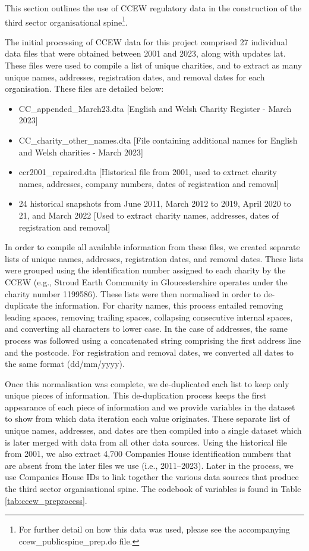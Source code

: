 \documentclass{article}
\begin{document}
This section outlines the use of CCEW regulatory data in the construction of the third sector
organisational spine\footnote{For further detail on how this data was used, please see the accompanying
ccew\_publicspine\_prep.do file.}.

The initial processing of CCEW data for this project comprised 27 individual data files that were obtained
between 2001 and 2023, along with updates lat. These files were used to compile a list of unique charities, and to
extract   as   many   unique   names,   addresses,   registration   dates,   and   removal   dates   for   each
organisation. These files are detailed below: 
\begin{itemize}
  \item CC\_appended\_March23.dta [English and Welsh Charity Register - March 2023]

  \item CC\_charity\_other\_names.dta [File containing additional names for English and Welsh
charities - March 2023]
  \item ccr2001\_repaired.dta   [Historical   file   from   2001,   used   to   extract   charity   names,
addresses, company numbers, dates of registration and removal]
  \item 24 historical snapshots from June 2011, March 2012 to 2019, April 2020 to 21, and March
2022 [Used to extract charity names, addresses, dates of registration and removal]
\end{itemize}

In order to compile all available information from these files, we created separate lists of unique
names, addresses, registration dates, and removal dates. These lists were grouped using the
identification number assigned to each charity by the CCEW (e.g., Stroud Earth Community in
Gloucestershire operates under the charity number 1199586). These lists were then normalised
in order to de-duplicate the information. For charity names, this process entailed removing
leading   spaces,   removing   trailing   spaces,   collapsing   consecutive   internal   spaces,   and
converting all characters to lower case. In the case of addresses, the same process was followed
using a concatenated string comprising the first address line and the postcode. For registration
and removal dates, we converted all dates to the same format (dd/mm/yyyy).

Once this normalisation was complete, we de-duplicated each list to keep only unique pieces of
information.   This   de-duplication   process   keeps   the   first   appearance   of   each   piece   of
information and we provide variables in the dataset to show from which data iteration each
value originates. These separate list of unique names, addresses, and dates are then compiled
into a single dataset which is later merged with data from all other data sources. Using the
historical file from 2001, we also extract 4,700 Companies House identification numbers that
are absent from the later files we use (i.e., 2011–2023). Later in the process, we use Companies
House IDs to link together the various data sources that produce the third sector organisational
spine.
The codebook of variables is found in Table \ref{tab:ccew_preprocess}.
\end{document}
